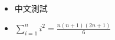 \begin{itemize}
\item 中文測試 
\item $\sum \limits_{i=1}^n i^2 = \frac{n(n+1)(2n+1)}{6}$
\end{itemize}
